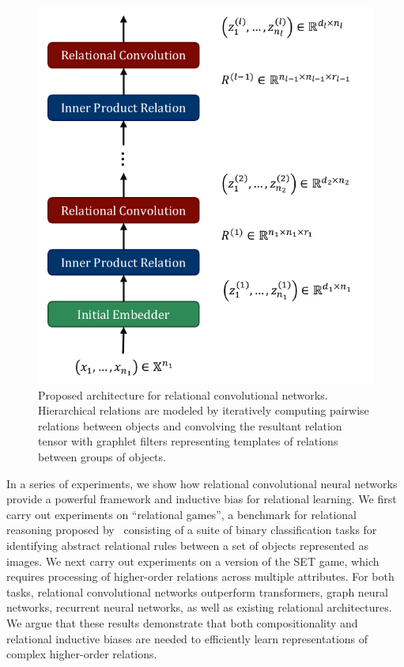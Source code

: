 \begin{figure}
    \centering
    \includegraphics[width=.5\textwidth]{figs/relconv_architecture.pdf}
    \caption{Proposed architecture for relational convolutional networks. Hierarchical relations are modeled by iteratively computing pairwise relations between objects and convolving the resultant relation tensor with graphlet filters representing templates of relations between groups of objects.
    }\label{fig:relconv_architecture}
\end{figure}

In a series of experiments, we show how relational convolutional neural networks provide a powerful framework and inductive bias for relational learning. We first carry out experiments on ``relational games'', a benchmark for relational reasoning proposed by~\citep{shanahanExplicitlyRelationalNeural} consisting of a suite of binary classification tasks for identifying abstract relational rules between a set of objects represented as images. We next carry out experiments on a version of the SET game, which requires processing of higher-order relations across multiple attributes. For both tasks, relational convolutional networks outperform transformers, graph neural networks, recurrent neural networks, as well as existing relational architectures. We argue that these results demonstrate that both compositionality and relational inductive biases are needed to efficiently learn representations of complex higher-order relations.

